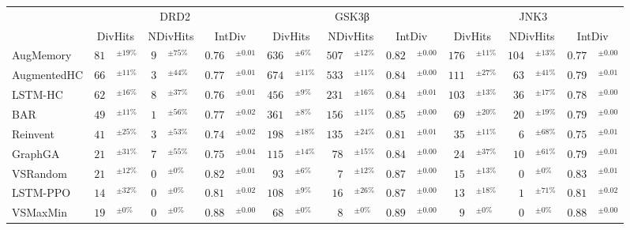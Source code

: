 \begin{tabular}{lr@{}lr@{}lr@{}lr@{}lr@{}lr@{}lr@{}lr@{}lr@{}l}
\toprule
 & \multicolumn{6}{c}{DRD2} & \multicolumn{6}{c}{GSK3β} & \multicolumn{6}{c}{JNK3} \\
\cmidrule(lr){2-7} \cmidrule(lr){8-13} \cmidrule(lr){14-19}
 & \multicolumn{2}{c}{DivHits} & \multicolumn{2}{c}{NDivHits} & \multicolumn{2}{c}{IntDiv} & \multicolumn{2}{c}{DivHits} & \multicolumn{2}{c}{NDivHits} & \multicolumn{2}{c}{IntDiv} & \multicolumn{2}{c}{DivHits} & \multicolumn{2}{c}{NDivHits} & \multicolumn{2}{c}{IntDiv} \\
\midrule
AugMemory & $81$& $^{\pm19\%}$ & $9$& $^{\pm75\%}$ & $0.76$& $^{\pm0.01}$ & $636$& $^{\pm6\%}$ & $507$& $^{\pm12\%}$ & $0.82$& $^{\pm0.00}$ & $176$& $^{\pm11\%}$ & $104$& $^{\pm13\%}$ & $0.77$& $^{\pm0.00}$ \\
AugmentedHC & $66$& $^{\pm11\%}$ & $3$& $^{\pm44\%}$ & $0.77$& $^{\pm0.01}$ & $674$& $^{\pm11\%}$ & $533$& $^{\pm11\%}$ & $0.84$& $^{\pm0.00}$ & $111$& $^{\pm27\%}$ & $63$& $^{\pm41\%}$ & $0.79$& $^{\pm0.01}$ \\
LSTM-HC & $62$& $^{\pm16\%}$ & $8$& $^{\pm37\%}$ & $0.76$& $^{\pm0.01}$ & $456$& $^{\pm9\%}$ & $231$& $^{\pm16\%}$ & $0.84$& $^{\pm0.01}$ & $103$& $^{\pm13\%}$ & $36$& $^{\pm17\%}$ & $0.78$& $^{\pm0.00}$ \\
BAR & $49$& $^{\pm11\%}$ & $1$& $^{\pm56\%}$ & $0.77$& $^{\pm0.02}$ & $361$& $^{\pm8\%}$ & $156$& $^{\pm11\%}$ & $0.85$& $^{\pm0.00}$ & $69$& $^{\pm20\%}$ & $20$& $^{\pm19\%}$ & $0.79$& $^{\pm0.00}$ \\
Reinvent & $41$& $^{\pm25\%}$ & $3$& $^{\pm53\%}$ & $0.74$& $^{\pm0.02}$ & $198$& $^{\pm18\%}$ & $135$& $^{\pm24\%}$ & $0.81$& $^{\pm0.01}$ & $35$& $^{\pm11\%}$ & $6$& $^{\pm68\%}$ & $0.75$& $^{\pm0.01}$ \\
GraphGA & $21$& $^{\pm31\%}$ & $7$& $^{\pm55\%}$ & $0.75$& $^{\pm0.04}$ & $115$& $^{\pm14\%}$ & $78$& $^{\pm15\%}$ & $0.84$& $^{\pm0.00}$ & $24$& $^{\pm37\%}$ & $10$& $^{\pm61\%}$ & $0.79$& $^{\pm0.01}$ \\
VSRandom & $21$& $^{\pm12\%}$ & $0$& $^{\pm0\%}$ & $0.82$& $^{\pm0.01}$ & $93$& $^{\pm6\%}$ & $7$& $^{\pm12\%}$ & $0.87$& $^{\pm0.00}$ & $15$& $^{\pm13\%}$ & $0$& $^{\pm0\%}$ & $0.83$& $^{\pm0.01}$ \\
LSTM-PPO & $14$& $^{\pm32\%}$ & $0$& $^{\pm0\%}$ & $0.81$& $^{\pm0.02}$ & $108$& $^{\pm9\%}$ & $16$& $^{\pm26\%}$ & $0.87$& $^{\pm0.00}$ & $13$& $^{\pm18\%}$ & $1$& $^{\pm71\%}$ & $0.81$& $^{\pm0.02}$ \\
VSMaxMin & $19$& $^{\pm0\%}$ & $0$& $^{\pm0\%}$ & $0.88$& $^{\pm0.00}$ & $68$& $^{\pm0\%}$ & $8$& $^{\pm0\%}$ & $0.89$& $^{\pm0.00}$ & $9$& $^{\pm0\%}$ & $0$& $^{\pm0\%}$ & $0.88$& $^{\pm0.00}$ \\

\end{tabular}
